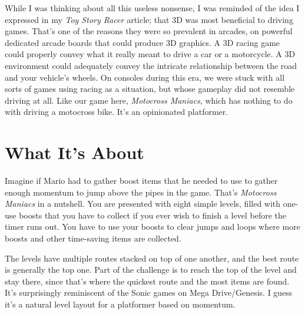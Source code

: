\documentclass{book}
\begin{document}
While I was thinking about all this useless nonsense, I was reminded of the idea I expressed in my \emph{Toy Story Racer} article; that 3D was most beneficial to driving games. That’s one of the reasons they were so prevalent in arcades, on powerful dedicated arcade boards that could produce 3D graphics. A 3D racing game could properly convey what it really meant to drive a car or a motorcycle. A 3D environment could adequately convey the intricate relationship between the road and your vehicle’s wheels. On consoles during this era, we were stuck with all sorts of games using racing as a situation, but whose gameplay did not resemble driving at all. Like our game here, \emph{Motocross Maniacs}, which has nothing to do with driving a motocross bike. It’s an opinionated platformer.\par
\FloatBarrier\section*{What It’s About}
Imagine if Mario had to gather boost items that he needed to use to gather enough momentum to jump above the pipes in the game. That’s \emph{Motocross Maniacs} in a nutshell. You are presented with eight simple levels, filled with one-use boosts that you have to collect if you ever wish to finish a level before the timer runs out. You have to use your boosts to clear jumps and loops where more boosts and other time-saving items are collected.\par
The levels have multiple routes stacked on top of one another, and the best route is generally the top one. Part of the challenge is to reach the top of the level and stay there, since that’s where the quickest route and the most items are found. It’s surprisingly reminiscent of the Sonic games on Mega Drive/Genesis. I guess it’s a natural level layout for a platformer based on momentum.\par
\FloatBarrier\vspace{\baselineskip}\centering
\begin{minipage}{0.45\linewidth}\end{minipage}\vspace{2pt}
\begin{minipage}{0.45\linewidth}\end{minipage}
\par\justifying
\end{document}
